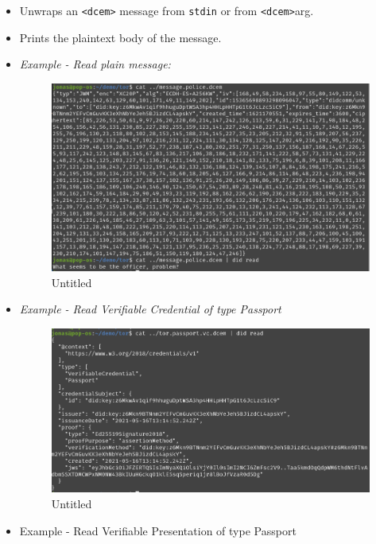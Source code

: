 \begin{itemize}
\item
  Unwraps an \passthrough{\lstinline!<dcem>!} message from
  \passthrough{\lstinline!stdin!} or from
  \passthrough{\lstinline!<dcem>!}arg.
\item
  Prints the plaintext body of the message.
\item
  \emph{Example - Read plain message:}

  \begin{figure}
  \centering
  \includegraphics{User Interface f8759a9462b24d5f95cf6123d68b89ea/Untitled 7.png}
  \caption{Untitled}
  \end{figure}
\item
  \emph{Example - Read Verifiable Credential of type Passport}

  \begin{figure}
  \centering
  \includegraphics{User Interface f8759a9462b24d5f95cf6123d68b89ea/Untitled 8.png}
  \caption{Untitled}
  \end{figure}
\item
  Example - Read Verifiable Presentation of type Passport


\end{itemize}
